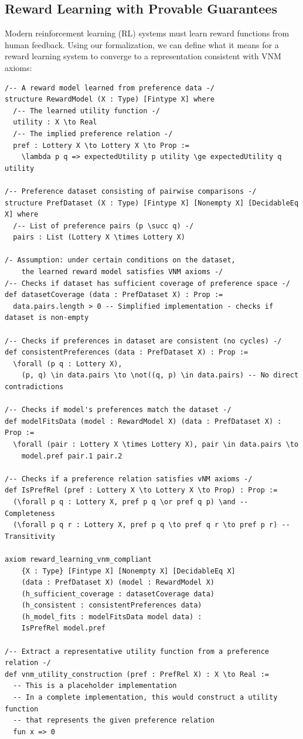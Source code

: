 \documentclass{article}
\theoremstyle{definition}
\begin{document}
\subsection{Reward Learning with Provable Guarantees}\label{sec:ai:reward learning}

Modern reinforcement learning (RL) systems must learn reward functions from human feedback. Using our formalization, we can define what it means for a reward learning system to converge to a representation consistent with VNM axioms:

\begin{lstlisting}[caption={Reward Learning with Provable Guarantees: Lean 4 Implementation}]
/-- A reward model learned from preference data -/
structure RewardModel (X : Type) [Fintype X] where
  /-- The learned utility function -/
  utility : X \to Real
  /-- The implied preference relation -/
  pref : Lottery X \to Lottery X \to Prop :=
    \lambda p q => expectedUtility p utility \ge expectedUtility q utility

/-- Preference dataset consisting of pairwise comparisons -/
structure PrefDataset (X : Type) [Fintype X] [Nonempty X] [DecidableEq X] where
  /-- List of preference pairs (p \succ q) -/
  pairs : List (Lottery X \times Lottery X)

/- Assumption: under certain conditions on the dataset,
    the learned reward model satisfies VNM axioms -/
/-- Checks if dataset has sufficient coverage of preference space -/
def datasetCoverage (data : PrefDataset X) : Prop :=
  data.pairs.length > 0 -- Simplified implementation - checks if dataset is non-empty

/-- Checks if preferences in dataset are consistent (no cycles) -/
def consistentPreferences (data : PrefDataset X) : Prop :=
  \forall (p q : Lottery X),
    (p, q) \in data.pairs \to \not((q, p) \in data.pairs) -- No direct contradictions

/-- Checks if model's preferences match the dataset -/
def modelFitsData (model : RewardModel X) (data : PrefDataset X) : Prop :=
  \forall (pair : Lottery X \times Lottery X), pair \in data.pairs \to
    model.pref pair.1 pair.2

/-- Checks if a preference relation satisfies vNM axioms -/
def IsPrefRel (pref : Lottery X \to Lottery X \to Prop) : Prop :=
  (\forall p q : Lottery X, pref p q \or pref q p) \and -- Completeness
  (\forall p q r : Lottery X, pref p q \to pref q r \to pref p r) -- Transitivity

axiom reward_learning_vnm_compliant
    {X : Type} [Fintype X] [Nonempty X] [DecidableEq X]
    (data : PrefDataset X) (model : RewardModel X)
    (h_sufficient_coverage : datasetCoverage data)
    (h_consistent : consistentPreferences data)
    (h_model_fits : modelFitsData model data) :
    IsPrefRel model.pref

/-- Extract a representative utility function from a preference relation -/
def vnm_utility_construction (pref : PrefRel X) : X \to Real :=
  -- This is a placeholder implementation
  -- In a complete implementation, this would construct a utility function
  -- that represents the given preference relation
  fun x => 0
\end{lstlisting}
\end{document}
